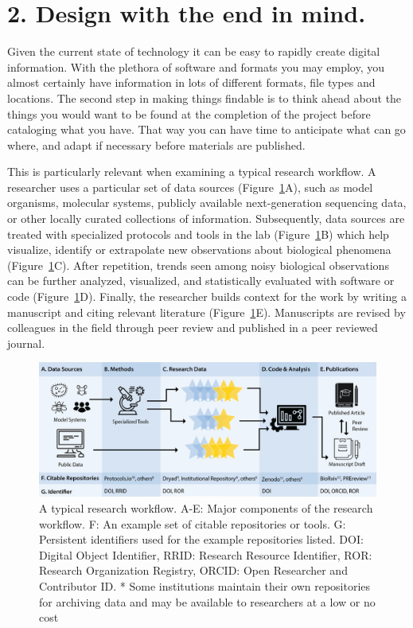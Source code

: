 \documentclass[10pt,letterpaper]{article}
\newcommand{\rulemajor}[1]{\section*{#1}}
\begin{document}
\rulemajor{2. Design with the end in mind.}

Given the current state of technology it can be easy to rapidly create digital
information. With the plethora of software and formats you may employ, you
almost certainly have information in lots of different formats, file types and
locations. The second step in making things findable is to think ahead about
the things you would want to be found at the completion of the project before
cataloging what you have. That way you can have time to anticipate what can go
where, and adapt if necessary before materials are published.

This is particularly relevant when examining a typical research workflow. A
researcher uses a particular set of data sources (Figure~\ref{workflow}A), such
as model organisms, molecular systems, publicly available next-generation
sequencing data, or other locally curated collections of information.
Subsequently, data sources are treated with specialized protocols and tools in
the lab (Figure~\ref{workflow}B) which help visualize, identify or extrapolate
new observations about biological phenomena (Figure~\ref{workflow}C). After
repetition, trends seen among noisy biological observations can be further
analyzed, visualized, and statistically evaluated with software or code
(Figure~\ref{workflow}D). Finally, the researcher builds context for the work by
writing a manuscript and citing relevant literature (Figure~\ref{workflow}E).
Manuscripts are revised by colleagues in the field through peer review
and published in a peer reviewed journal.

\begin{figure}
  \includegraphics[width=\textwidth]{workflow.png}
  \captionsetup{justification=centering}
  \caption{A typical research workflow. A-E: Major components of the research workflow.
  F: An example set of citable repositories or tools. G: Persistent identifiers used
  for the example repositories listed. DOI: Digital Object Identifier, RRID: Research
  Resource Identifier, ROR: Research Organization Registry, ORCID: Open Researcher and 
  Contributor ID. * Some institutions maintain their own repositories for archiving data
  and may be available to researchers at a low or no cost}
  \label{workflow}
\end{figure}
\end{document}
